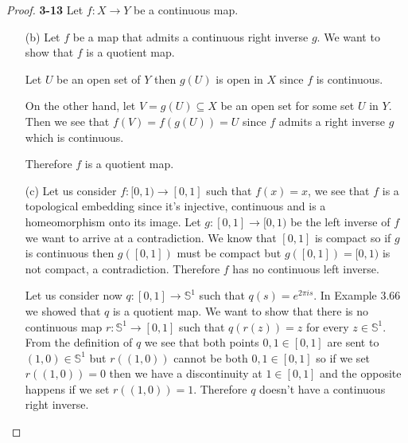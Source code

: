 \documentclass[11pt]{article}
\theoremstyle{definition}
\begin{document}
\cleardoublepage
\begin{proof}{\textbf{3-13}}
    Let $f:X \to Y$ be a continuous map.
    \begin{itemize}
        \item [(b)] Let $f$ be a map that admits a continuous right inverse $g$.
        We want to show that $f$ is a quotient map.
        
        Let $U$ be an open set of $Y$ then $g(U)$ is open in $X$ since $f$
        is continuous.

        On the other hand, let $V = g(U) \subseteq X$ be an open set for
        some set $U$ in $Y$. Then we see that $f(V) = f(g(U)) = U$ since
        $f$ admits a right inverse $g$ which is continuous.
        
        Therefore $f$ is a quotient map.

        \item [(c)]
        Let us consider $f: [0,1) \to [0,1]$ such that $f(x) = x$, we see that
        $f$ is a topological embedding since it's injective, continuous and
        is a homeomorphism onto its image. Let $g: [0,1] \to [0,1)$ be the
        left inverse of $f$ we want to arrive at a contradiction.
        We know that $[0,1]$ is compact so if $g$ is
        continuous then $g([0,1])$ must be compact but $g([0,1]) = [0,1)$
        is not compact, a contradiction. Therefore $f$ has no continuous
        left inverse.
        
        Let us consider now $q:[0,1] \to \mathbb{S}^1$ such that
        $q(s) = e^{2\pi i s}$. In Example 3.66 we showed that $q$ is a
        quotient map. We want to show that there is no continuous map
        $r: \mathbb{S}^1 \to [0,1]$ such that $q(r(z)) = z$ for every
        $z \in \mathbb{S}^1$.
        From the definition of $q$ we see that both points $0,1 \in [0,1]$ are 
        sent to $(1,0) \in \mathbb{S}^1$ but $r((1,0))$ cannot be both
        $0,1 \in [0,1]$ so if we set $r((1,0)) = 0$ then we have a
        discontinuity at $1 \in [0,1]$ and the opposite happens if we set
        $r((1,0)) = 1$.
        Therefore $q$ doesn't have a continuous right inverse.
    \end{itemize}
\end{proof}
\cleardoublepage
\end{document}
